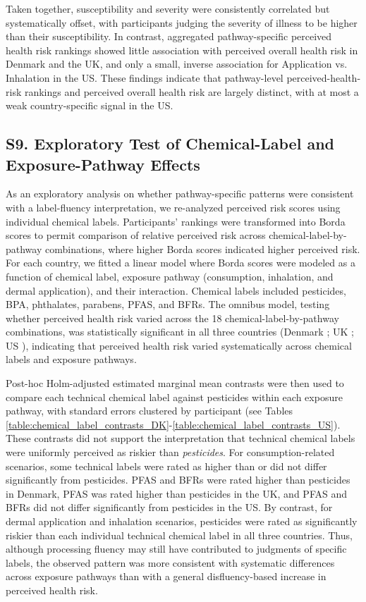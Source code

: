 Taken together, susceptibility and severity were consistently correlated but systematically offset, with participants judging the severity of illness to be higher than their susceptibility. In contrast, aggregated pathway-specific perceived health risk rankings showed little association with perceived overall health risk in Denmark and the UK, and only a small, inverse association for Application vs. Inhalation in the US. These findings indicate that pathway-level perceived-health-risk rankings and perceived overall health risk are largely distinct, with at most a weak country-specific signal in the US.

\subsection{S9. Exploratory Test of Chemical-Label and Exposure-Pathway Effects}
As an exploratory analysis on whether pathway-specific patterns were consistent with a label-fluency interpretation, we re-analyzed perceived risk scores using individual chemical labels. Participants' rankings were transformed into Borda scores to permit comparison of relative perceived risk across chemical-label-by-pathway combinations, where higher Borda scores indicated higher perceived risk. For each country, we fitted a linear model where Borda scores were modeled as a function of chemical label, exposure pathway (consumption, inhalation, and dermal application), and their interaction. Chemical labels included pesticides, BPA, phthalates, parabens, PFAS, and BFRs. The omnibus model, testing whether perceived health risk varied across the 18 chemical-label-by-pathway combinations, was statistically significant in all three countries (Denmark ; UK ; US ), indicating that perceived health risk varied systematically across chemical labels and exposure pathways.

Post-hoc Holm-adjusted estimated marginal mean contrasts were then used to compare each technical chemical label against pesticides within each exposure pathway, with standard errors clustered by participant (see Tables \ref{table:chemical_label_contrasts_DK}-\ref{table:chemical_label_contrasts_US}). These contrasts did not support the interpretation that technical chemical labels were uniformly perceived as riskier than \emph{pesticides}. For consumption-related scenarios, some technical labels were rated as higher than or did not differ significantly from pesticides. PFAS and BFRs were rated higher than pesticides in Denmark, PFAS was rated higher than pesticides in the UK, and PFAS and BFRs did not differ significantly from pesticides in the US. By contrast, for dermal application and inhalation scenarios, pesticides were rated as significantly riskier than each individual technical chemical label in all three countries. Thus, although processing fluency may still have contributed to judgments of specific labels, the observed pattern was more consistent with systematic differences across exposure pathways than with a general disfluency-based increase in perceived health risk.






\clearpage
\printbibliography[title={Supplemental References}]
